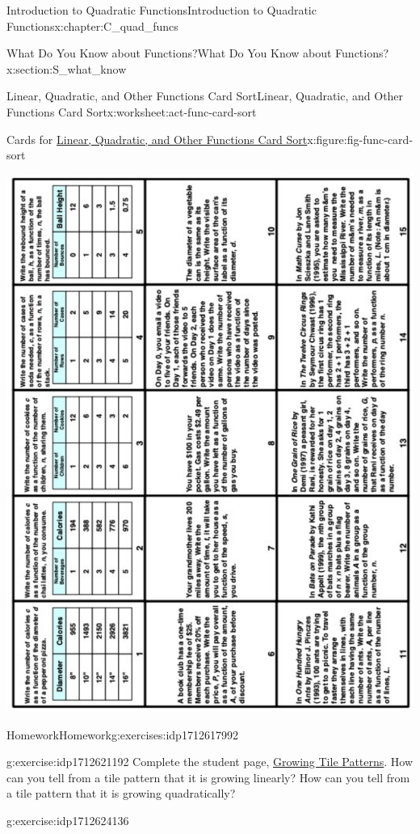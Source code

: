 \documentclass[oneside,10pt,]{book}
\numberwithin{equation}{chapter}
\begin{document}
\begin{chapterptx}{Introduction to Quadratic Functions}{}{Introduction to Quadratic Functions}{}{}{x:chapter:C_quad_funcs}
\begin{sectionptx}{What Do You Know about Functions?}{}{What Do You Know about Functions?}{}{}{x:section:S_what_know}
\begin{worksheet-subsection}{Linear, Quadratic, and Other Functions Card Sort}{}{Linear, Quadratic, and Other Functions Card Sort}{}{}{x:worksheet:act-func-card-sort}
\begin{figureptx}{Cards for \hyperref[x:worksheet:act-func-card-sort]{Linear, Quadratic, and Other Functions Card Sort}}{x:figure:fig-func-card-sort}{}
\begin{image}{0}{1}{0}
\includegraphics[width=\linewidth]{external/func-card-sort.pdf}
\end{image}%
\tcblower
\end{figureptx}%
\end{worksheet-subsection}
\restoregeometry
%
%
\typeout{************************************************}
\typeout{************************************************}
%
\begin{exercises-subsection}{Homework}{}{Homework}{}{}{g:exercises:idp1712617992}
\begin{divisionexercise}{1}{}{}{g:exercise:idp1712621192}%
Complete the student page, \hyperref[x:worksheet:act-grow-tiles]{Growing Tile Patterns}. How can you tell from a tile pattern that it is growing linearly? How can you tell from a tile pattern that it is growing quadratically?%
\end{divisionexercise}%
\begin{divisionexercise}{2}{}{}{g:exercise:idp1712624136}%

\end{divisionexercise}
\end{exercises-subsection}
\end{sectionptx}
\end{chapterptx}
\end{document}
